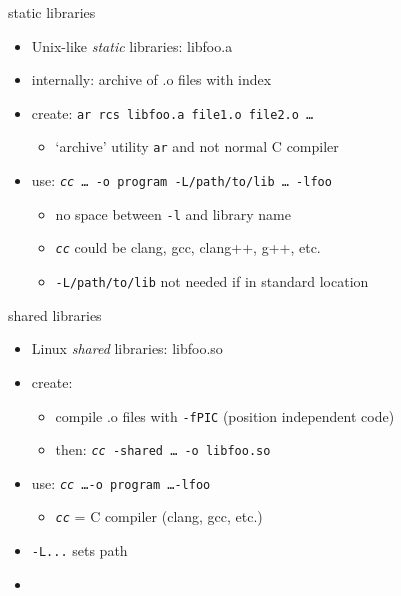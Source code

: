 \begin{frame}{static libraries}
    \begin{itemize}
    \item Unix-like \textit{static} libraries: libfoo.a
    \item internally: archive of .o files with index
    \item create: \texttt{ar rcs libfoo.a file1.o file2.o \ldots}
        \begin{itemize}
        \item `archive' utility \texttt{ar} and not normal C compiler
        \end{itemize}
    \item use: \texttt{\textit{cc} \ldots~-o program -L/path/to/lib \ldots~-lfoo}
        \begin{itemize}
        \item no space between \texttt{-l} and library name
        \item \texttt{\textit{cc}} could be clang, gcc, clang++, g++, etc.
        \item \texttt{-L/path/to/lib} not needed if in standard location
        \end{itemize}
    \end{itemize}
\end{frame}

\begin{frame}{shared libraries}
    \begin{itemize}
    \item Linux \textit{shared} libraries: libfoo.so
    \item create:
        \begin{itemize}
        \item compile .o files with \texttt{-fPIC} (position independent code)
        \item then: \texttt{\textit{cc} -shared \ldots~-o libfoo.so}
        \end{itemize}
    \item use: \texttt{\textit{cc} \ldots -o program  \ldots -lfoo}
        \begin{itemize}
        \item \texttt{\textit{cc}} = C compiler (clang, gcc, etc.)
        \end{itemize}
    \vspace{.5cm}
    \item<2-> \texttt{-L...} sets path \textit{}
    \item<2-> 
    \end{itemize}
\end{frame}


